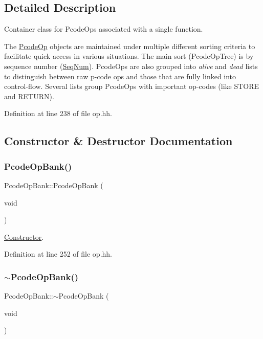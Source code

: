 \subsection{Detailed Description}
Container class for Pcode\+Ops associated with a single function. 

The \mbox{\hyperlink{class_pcode_op}{Pcode\+Op}} objects are maintained under multiple different sorting criteria to facilitate quick access in various situations. The main sort (Pcode\+Op\+Tree) is by sequence number (\mbox{\hyperlink{class_seq_num}{Seq\+Num}}). Pcode\+Ops are also grouped into {\itshape alive} and {\itshape dead} lists to distinguish between raw p-\/code ops and those that are fully linked into control-\/flow. Several lists group Pcode\+Ops with important op-\/codes (like S\+T\+O\+RE and R\+E\+T\+U\+RN). 

Definition at line 238 of file op.\+hh.



\subsection{Constructor \& Destructor Documentation}
\mbox{\label{class_pcode_op_bank_ab5d777cf16d8e0d730a189b22ef0817c}} 
\subsubsection{\texorpdfstring{PcodeOpBank()}{PcodeOpBank()}}
{\footnotesize\ttfamily Pcode\+Op\+Bank\+::\+Pcode\+Op\+Bank (\begin{DoxyParamCaption}\item[{void}]{ }\end{DoxyParamCaption})\hspace{0.3cm}{\ttfamily [inline]}}



\mbox{\hyperlink{class_constructor}{Constructor}}. 



Definition at line 252 of file op.\+hh.

\mbox{\label{class_pcode_op_bank_af8613c0a59c2de072acc830f3b24b8e9}} 
\subsubsection{\texorpdfstring{$\sim$PcodeOpBank()}{~PcodeOpBank()}}
{\footnotesize\ttfamily Pcode\+Op\+Bank\+::$\sim$\+Pcode\+Op\+Bank (\begin{DoxyParamCaption}\item[{void}]{ }\end{DoxyParamCaption})\hspace{0.3cm}{\ttfamily [inline]}}




